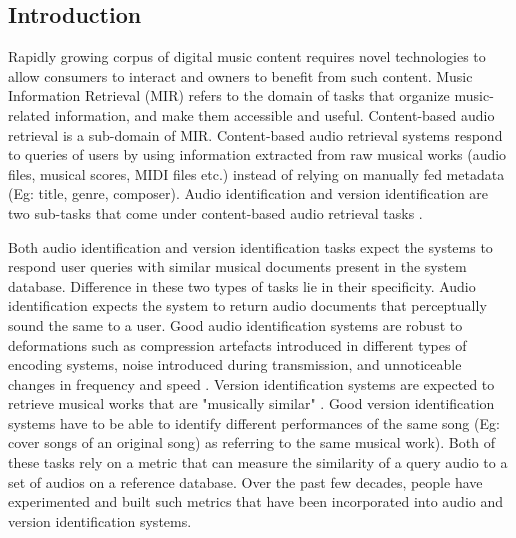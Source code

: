 \documentclass[../main.tex]{subfiles}
\begin{document}
\subsection{Introduction}

\par
Rapidly growing corpus of digital music content requires novel technologies to allow consumers to interact and owners to benefit from such content. Music Information Retrieval (\gls{MIR}) refers to the domain of tasks that organize music-related information, and make them accessible and useful. Content-based audio retrieval is a sub-domain of \gls{MIR}. Content-based audio retrieval systems respond to queries of users by using information extracted from raw musical works (audio files, musical scores, MIDI files etc.) instead of relying on manually fed metadata (Eg: title, genre, composer). Audio identification and version identification are two sub-tasks that come under content-based audio retrieval tasks \cite{book}.

\par
Both audio identification and version identification tasks expect the systems to respond user queries with similar musical documents present in the system database. Difference in these two types of tasks lie in their specificity. Audio identification expects the system to return audio documents that perceptually sound the same to a user. Good audio identification systems are robust to deformations such as compression artefacts introduced in different types of encoding systems, noise introduced during transmission, and unnoticeable changes in frequency and speed \cite{book}. Version identification systems are expected to retrieve musical works that are "musically similar" \cite{serraAudioCoverSong2010}. Good version identification systems have to be able to identify different performances of the same song (Eg: cover songs of an original song) as referring to the same musical work). Both of these tasks rely on a metric that can measure the similarity of a query audio to a set of audios on a reference database. Over the past few decades, people have experimented and built such metrics that have been incorporated into audio and version identification systems.
\end{document}

